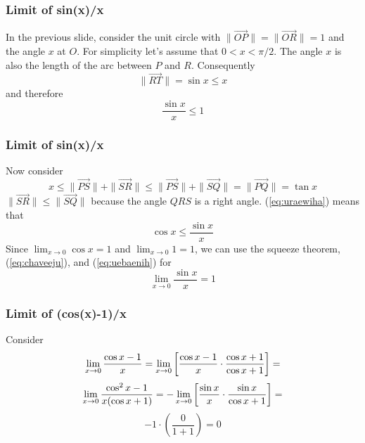 \documentclass[xcolor=dvipsnames]{beamer}
\begin{document}
\begin{frame}
  \frametitle{Limit of sin(x)/x}
  In the previous slide, consider the unit circle with
  $\|\vec{OP}\|=\|\vec{OR}\|=1$ and the angle $x$ at $O$. For simplicity let's
  assume that $0<x<\pi/2$. The angle $x$ is also the length of the arc
  between $P$ and $R$. Consequently
  \begin{equation}
    \label{eq:iufoobue}
\|\vec{RT}\|=\sin{}x\leq{}x    
  \end{equation}
  and therefore
  \begin{equation}
    \label{eq:chaveeju}
    \frac{\sin{}x}{x}\leq{}1
  \end{equation}
\end{frame}

\begin{frame}
  \frametitle{Limit of sin(x)/x}
  Now consider
  \begin{equation}
    \label{eq:uraewiha}
    x\leq\|\vec{PS}\|+\|\vec{SR}\|\leq\|\vec{PS}\|+\|\vec{SQ}\|=\|\vec{PQ}\|=\tan{}x
  \end{equation}
$\|\vec{SR}\|\leq\|\vec{SQ}\|$ because the angle $QRS$ is a right angle.
(\ref{eq:uraewiha}) means that
\begin{equation}
  \label{eq:uebaenih}
  \cos{}x\leq\frac{\sin{}x}{x}
\end{equation}
Since $\lim_{x\rightarrow{}0}\cos{}x=1$ and $\lim_{x\rightarrow{}0}1=1$, we can use the squeeze
theorem, (\ref{eq:chaveeju}), and (\ref{eq:uebaenih}) for
\begin{equation}
  \label{eq:guabighe}
  \lim_{x\rightarrow{}0}\frac{\sin{}x}{x}=1
\end{equation}
\end{frame}

\begin{frame}
  \frametitle{Limit of (cos(x)-1)/x}
  Consider
  \begin{equation}
    \label{eq:ungaeciz}
    \lim_{x\rightarrow{}0}\frac{\cos{}x-1}{x}=\lim_{x\rightarrow{}0}\left[\frac{\cos{}x-1}{x}\cdot\frac{\cos{}x+1}{\cos{}x+1}\right]=\notag
  \end{equation}
  \begin{equation}
    \label{eq:xiecahze}
    \lim_{x\rightarrow{}0}\frac{\cos^{2}x-1}{x(\cos{}x+1)}=-\lim_{x\rightarrow{}0}\left[\frac{\sin{}x}{x}\cdot\frac{\sin{}x}{\cos{}x+1}\right]=\notag
  \end{equation}
  \begin{equation}
    \label{eq:angoohee}
    -1\cdot\left(\frac{0}{1+1}\right)=0
  \end{equation}
\end{frame}
\end{document}

